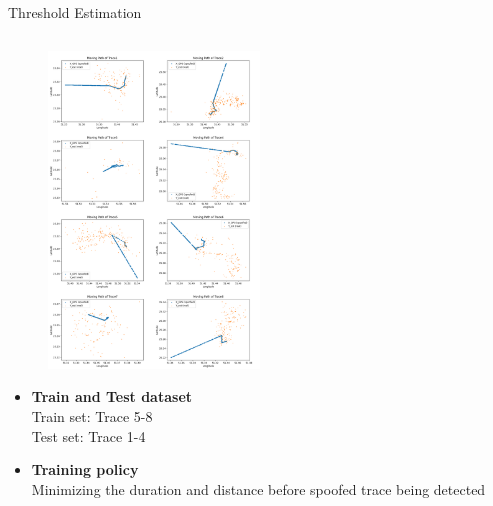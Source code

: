\documentclass[aspectratio=169, 8pt]{beamer}
\begin{document}
\begin{frame}{Threshold Estimation}
\begin{columns}
        \begin{column}{0.4\linewidth}
            \begin{figure}
                \centering
                \includegraphics[width = 0.5\textwidth]{images/Garrett_moving_path.png}
                \label{fig:enter-label}
            \end{figure}
           \begin{itemize}
               \item \textbf{Train and Test dataset} \\
                Train set: Trace 5-8 \\
                Test set: Trace 1-4
            \end{itemize}
            \begin{itemize}
                \item \textbf{Training policy} \\
                Minimizing the duration and distance before spoofed trace being detected
             \end{itemize}
    
           
       \end{column}
    \end{columns}
    
    
\end{frame}
\end{document}
